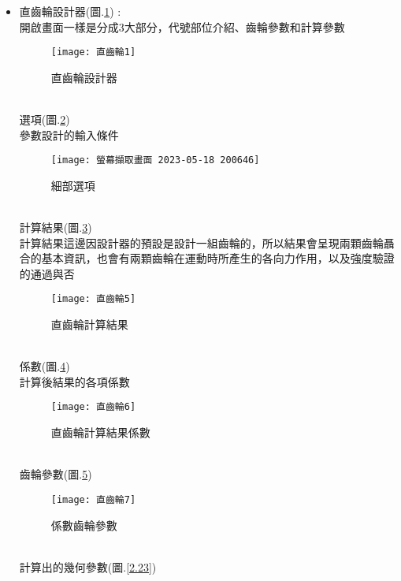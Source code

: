 \begin{itemize}
	\item 直齒輪設計器(圖.\ref{2.18}) :\\
		開啟畫面一樣是分成3大部分，代號部位介紹、齒輪參數和計算參數
		\begin{figure}[hbt!]
		\begin{center}
		\texttt{[image: 直齒輪1]}
		\caption{\Large 直齒輪設計器}\label{2.18}
		\end{center}
		\end{figure}
		\\
		選項(圖.\ref{2.19})\\
		參數設計的輸入條件\\
		\begin{figure}[hbt!]
		\begin{center}
		\texttt{[image: 螢幕擷取畫面 2023-05-18 200646]}
		\caption{\Large 細部選項}\label{2.19}
		\end{center}
		\end{figure}
		\\
		計算結果(圖.\ref{2.20})\\
		計算結果這邊因設計器的預設是設計一組齒輪的，所以結果會呈現兩顆齒輪聶合的基本資訊，也會有兩顆齒輪在運動時所產生的各向力作用，以及強度驗證的通過與否\\
		\begin{figure}[hbt!]
		\begin{center}
		\texttt{[image: 直齒輪5]}
		\caption{\Large 直齒輪計算結果}\label{2.20}
		\end{center}
		\end{figure}
		\\
		係數(圖.\ref{2.21})\\
		計算後結果的各項係數\\
		\begin{figure}[hbt!]
		\begin{center}
		\texttt{[image: 直齒輪6]}
		\caption{\Large 直齒輪計算結果係數}\label{2.21}
		\end{center}
		\end{figure}
		\\
		齒輪參數(圖.\ref{2.22})\\
		\begin{figure}[hbt!]
		\begin{center}
		\texttt{[image: 直齒輪7]}
		\caption{\Large 係數齒輪參數}\label{2.22}
		\end{center}
		\end{figure}
		\\
		計算出的幾何參數(圖.\ref{2.23})\\

\end{itemize}
